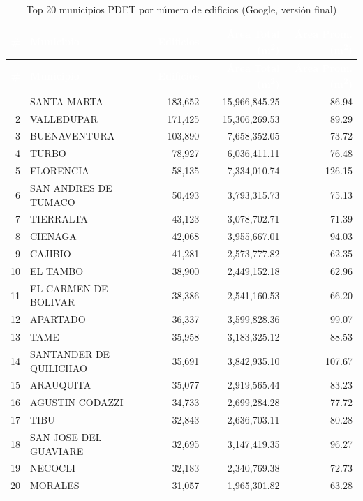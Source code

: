 \documentclass{article}
\newcommand{\tblhdr}[1]{%
  \cellcolor{azulclaro}\textbf{\textcolor{white}{#1}}%
}
\begin{document}
\begin{longtable}{r l r r r}
\caption{Top 20 municipios PDET por número de edificios (Google, versión final)} \\
\toprule
\tblhdr{\#} & \tblhdr{Municipio} & \tblhdr{Edificios} & \tblhdr{Área Total (m\textsuperscript{2})} & \tblhdr{Área Prom. (m\textsuperscript{2})} \\
\midrule
\endfirsthead
\toprule
\tblhdr{\#} & \tblhdr{Municipio} & \tblhdr{Edificios} & \tblhdr{Área Total (m\textsuperscript{2})} & \tblhdr{Área Prom. (m\textsuperscript{2})} \\
\midrule
\endhead
\bottomrule
\endfoot
1  & SANTA MARTA              & 183,652 & 15,966,845.25 & 86.94 \\
\rowcolor{grisfilas}
2  & VALLEDUPAR               & 171,425 & 15,306,269.53 & 89.29 \\
3  & BUENAVENTURA             & 103,890 & 7,658,352.05  & 73.72 \\
\rowcolor{grisfilas}
4  & TURBO                    & 78,927  & 6,036,411.11  & 76.48 \\
5  & FLORENCIA                & 58,135  & 7,334,010.74  & 126.15 \\
\rowcolor{grisfilas}
6  & SAN ANDRES DE TUMACO     & 50,493  & 3,793,315.73  & 75.13 \\
7  & TIERRALTA                & 43,123  & 3,078,702.71  & 71.39 \\
\rowcolor{grisfilas}
8  & CIENAGA                  & 42,068  & 3,955,667.01  & 94.03 \\
9  & CAJIBIO                  & 41,281  & 2,573,777.82  & 62.35 \\
\rowcolor{grisfilas}
10 & EL TAMBO                 & 38,900  & 2,449,152.18  & 62.96 \\
11 & EL CARMEN DE BOLIVAR     & 38,386  & 2,541,160.53  & 66.20 \\
\rowcolor{grisfilas}
12 & APARTADO                 & 36,337  & 3,599,828.36  & 99.07 \\
13 & TAME                     & 35,958  & 3,183,325.12  & 88.53 \\
\rowcolor{grisfilas}
14 & SANTANDER DE QUILICHAO   & 35,691  & 3,842,935.10  & 107.67 \\
15 & ARAUQUITA                & 35,077  & 2,919,565.44  & 83.23 \\
\rowcolor{grisfilas}
16 & AGUSTIN CODAZZI          & 34,733  & 2,699,284.28  & 77.72 \\
17 & TIBU                     & 32,843  & 2,636,703.11  & 80.28 \\
\rowcolor{grisfilas}
18 & SAN JOSE DEL GUAVIARE    & 32,695  & 3,147,419.35  & 96.27 \\
19 & NECOCLI                  & 32,183  & 2,340,769.38  & 72.73 \\
\rowcolor{grisfilas}
20 & MORALES                  & 31,057  & 1,965,301.82  & 63.28 \\
\end{longtable}
\end{document}
